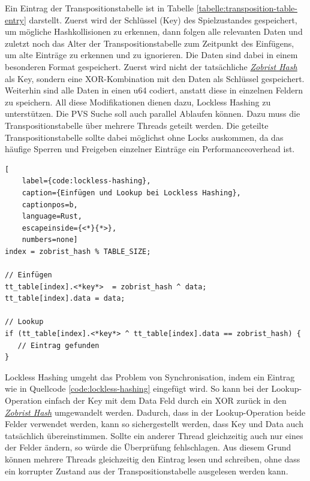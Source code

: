 \vspace*{-0.2cm}

Ein Eintrag der Transpositionstabelle ist in Tabelle \ref{tabelle:transposition-table-entry} darstellt. Zuerst wird der Schlüssel (Key) des Spielzustandes gespeichert, um mögliche Hashkollisionen zu erkennen, dann folgen alle relevanten Daten und zuletzt noch das Alter der Transpositionstabelle zum Zeitpunkt des Einfügens, um alte Einträge zu erkennen und zu ignorieren. Die Daten sind dabei in einem besonderen Format gespeichert. Zuerst wird nicht der tatsächliche \hyperref[text:zobrist-hash]{\emph{Zobrist Hash}} als Key, sondern eine \ac{XOR}-Kombination mit den Daten als Schlüssel gespeichert. Weiterhin sind alle Daten in einen \ac{u64} codiert, anstatt diese in einzelnen Feldern zu speichern. All diese Modifikationen dienen dazu, Lockless Hashing zu unterstützen. Die \ac{PVS} Suche soll auch parallel Ablaufen können. Dazu muss die Transpositionstabelle über mehrere Threads geteilt werden. Die geteilte Transpositionstabelle sollte dabei möglichst ohne Locks auskommen, da das häufige Sperren und Freigeben einzelner Einträge ein Performanceoverhead ist.

\begin{lstlisting}[
    label={code:lockless-hashing},
    caption={Einfügen und Lookup bei Lockless Hashing},
    captionpos=b,
    language=Rust,
    escapeinside={<*}{*>},
    numbers=none]
index = zobrist_hash % TABLE_SIZE;

// Einfügen
tt_table[index].<*key*>  = zobrist_hash ^ data;
tt_table[index].data = data;

// Lookup
if (tt_table[index].<*key*> ^ tt_table[index].data == zobrist_hash) {
   // Eintrag gefunden
}
\end{lstlisting}

Lockless Hashing umgeht das Problem von Synchronisation, indem ein Eintrag wie in Quellcode \ref{code:lockless-hashing} eingefügt wird. So kann bei der Lookup-Operation einfach der Key mit dem Data Feld durch ein \ac{XOR} zurück in den \hyperref[text:zobrist-hash]{\emph{Zobrist Hash}} umgewandelt werden. Dadurch, dass in der Lookup-Operation beide Felder verwendet werden, kann so sichergestellt werden, dass Key und Data auch tatsächlich übereinstimmen. Sollte ein anderer Thread gleichzeitig auch nur eines der Felder ändern, so würde die Überprüfung fehlschlagen. Aus diesem Grund können mehrere Threads gleichzeitig den Eintrag lesen und schreiben, ohne dass ein korrupter Zustand aus der Transpositionstabelle ausgelesen werden kann. \cite{2002.LocklessTT}


